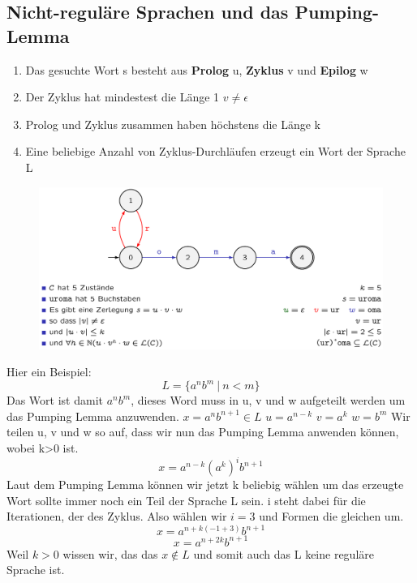 \documentclass[12pt,a4paper]{article}
\begin{document}
	\subsection{Nicht-reguläre Sprachen und das Pumping-Lemma}
	\begin{enumerate}
		\item Das gesuchte Wort s besteht aus \textbf{Prolog} u, \textbf{Zyklus} v und \textbf{Epilog} w
		\item Der Zyklus hat mindestest die Länge 1 $v \neq \epsilon$
		\item Prolog und Zyklus zusammen haben höchstens die Länge k
		\item Eine beliebige Anzahl von Zyklus-Durchläufen erzeugt ein Wort der Sprache L
	\end{enumerate}
	\begin{center}
		\begin{figure}[!h]
			\includegraphics[width=\textwidth]{Bilder/PumpingLemma.png}
		\end{figure}
	\end{center}
	\vspace{.5cm}
	Hier ein Beispiel:
	$$L=\{a^n b^m ~|~ n<m\}$$ \newline
	Das Wort ist damit $a^n b^m$, dieses Word muss in u, v und w aufgeteilt werden um das Pumping Lemma anzuwenden. \newline
	$x = a^nb^{n+1} \in L$ \newline
	$u = a^{n-k}$ \newline
	$v = a^k$ \newline
	$w = b^m$ \newline
	Wir teilen u, v und w so auf, dass wir nun das Pumping Lemma anwenden können, wobei k>0 ist.
	$$x = a^{n-k}(a^k)^ib^{n+1}$$
	Laut dem Pumping Lemma können wir jetzt k beliebig wählen um das erzeugte Wort sollte immer noch ein Teil der Sprache L sein. i steht dabei für die Iterationen, der des Zyklus. \newline
	Also wählen wir $ i = 3$ und Formen die gleichen um.
	$$x = a^{n + k(-1 +3)}b^{n+1}$$
	$$x = a^{n + 2k}b^{n+1}$$
	Weil $k>0$ wissen wir, das das $x \notin L$ und somit auch das L keine reguläre Sprache ist.
\end{document}
